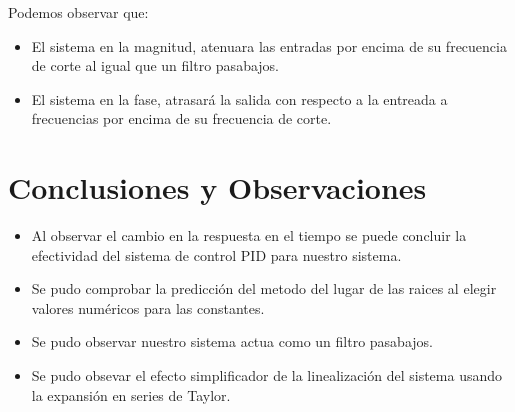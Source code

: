 \documentclass[a4paper]{IEEEtran} %
\begin{document}
Podemos observar que:

\begin{itemize}
    \item El sistema en la magnitud, atenuara las entradas por encima de su frecuencia de corte al igual que un filtro pasabajos.
    \item El sistema en la fase, atrasará la salida con respecto a la entreada a frecuencias por encima de su frecuencia de corte. 
\end{itemize}

\section{Conclusiones y Observaciones}
\begin{itemize}
    \item Al observar el cambio en la respuesta en el tiempo se puede concluir la efectividad del sistema de control PID para nuestro sistema.
    \item Se pudo comprobar la predicción del metodo del lugar de las raices al elegir valores numéricos para las constantes.
    \item Se pudo observar nuestro sistema actua como un filtro pasabajos.
    \item Se pudo obsevar el efecto simplificador de la linealización del sistema usando la expansión en series de Taylor.
\end{itemize}


\end{document}
